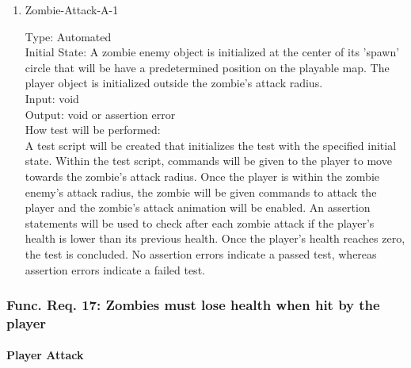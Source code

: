\documentclass[12pt, titlepage]{article}
\begin{document}
\begin{enumerate}

\item{Zombie-Attack-A-1\\}

Type: Automated \\
					
Initial State: A zombie enemy object is initialized at the center of its 'spawn' circle that will be have a predetermined position on the playable map. The player object is initialized outside the zombie's attack radius.\\
					
Input: void \\
					
Output: void or assertion error \\
					
How test will be performed:\\  A test script will be created that initializes the test with the specified initial state. Within the test script, commands will be given to the player to move towards the zombie's attack radius.  Once the player is within the zombie enemy's attack radius, the zombie will be given commands to attack the player and the zombie's attack animation will be enabled. An assertion statements will be used to check after each zombie attack if the player's health is lower than its previous health. Once the player's health reaches zero, the test is concluded. No assertion errors indicate a passed test, whereas assertion errors indicate a failed test.\\

\end{enumerate}

\subsubsection{Func. Req. 17: Zombies must lose health when hit by the player}

\paragraph{Player Attack}
\end{document}

